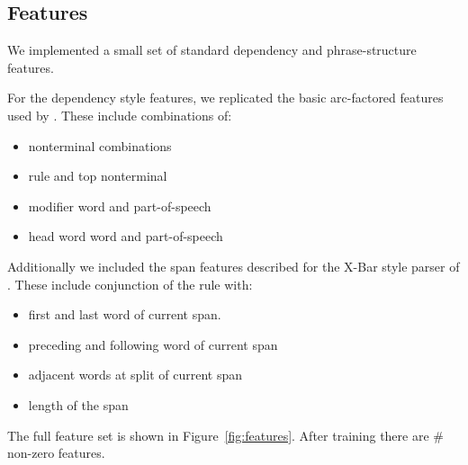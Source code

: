 \documentclass[11pt,letterpaper]{article}
\newcommand{\Rule}[3]{#1 \rightarrow #2\ #3}
\begin{document}
\subsection{Features}

We implemented a small set of standard dependency and phrase-structure features.

For the dependency style features, we replicated the basic arc-factored features
used by . These include combinations of:

\begin{itemize}
\item nonterminal combinations
\item rule and top nonterminal
\item modifier word and part-of-speech
\item head word word and part-of-speech
\end{itemize}

Additionally we included the span features described for the X-Bar style
parser of . These include conjunction of the rule
with:

\begin{itemize}
\item first and last word of current span.
\item preceding and following word of current span
\item adjacent words at split of current span
\item length of the span
\end{itemize}


The full feature set  is shown in Figure~\ref{fig:features}.
After training there are \# non-zero features.










\end{document}
